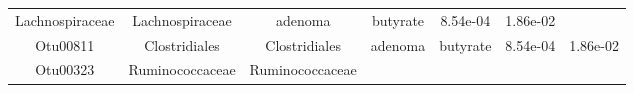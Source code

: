 \documentclass[11pt,]{article}
\begin{document}
\begin{longtable}[]{@{}ccccccc@{}}
\begin{minipage}[t]{0.17\columnwidth}
Lachnospiraceae\strut
\end{minipage} & \begin{minipage}[t]{0.17\columnwidth}\centering\strut
Lachnospiraceae\strut
\end{minipage} & \begin{minipage}[t]{0.09\columnwidth}\centering\strut
adenoma\strut
\end{minipage} & \begin{minipage}[t]{0.11\columnwidth}\centering\strut
butyrate\strut
\end{minipage} & \begin{minipage}[t]{0.09\columnwidth}\centering\strut
8.54e-04\strut
\end{minipage} & \begin{minipage}[t]{0.09\columnwidth}\centering\strut
1.86e-02\strut
\end{minipage}\tabularnewline
\begin{minipage}[t]{0.09\columnwidth}\centering\strut
Otu00811\strut
\end{minipage} & \begin{minipage}[t]{0.17\columnwidth}\centering\strut
Clostridiales\strut
\end{minipage} & \begin{minipage}[t]{0.17\columnwidth}\centering\strut
Clostridiales\strut
\end{minipage} & \begin{minipage}[t]{0.09\columnwidth}\centering\strut
adenoma\strut
\end{minipage} & \begin{minipage}[t]{0.11\columnwidth}\centering\strut
butyrate\strut
\end{minipage} & \begin{minipage}[t]{0.09\columnwidth}\centering\strut
8.54e-04\strut
\end{minipage} & \begin{minipage}[t]{0.09\columnwidth}\centering\strut
1.86e-02\strut
\end{minipage}\tabularnewline
\begin{minipage}[t]{0.09\columnwidth}\centering\strut
Otu00323\strut
\end{minipage} & \begin{minipage}[t]{0.17\columnwidth}\centering\strut
Ruminococcaceae\strut
\end{minipage} & \begin{minipage}[t]{0.17\columnwidth}\centering\strut
Ruminococcaceae\strut
\end{minipage} & \begin{minipage}[t]{0.09\columnwidth}\centering\strut

\end{minipage}
\end{longtable}
\end{document}
